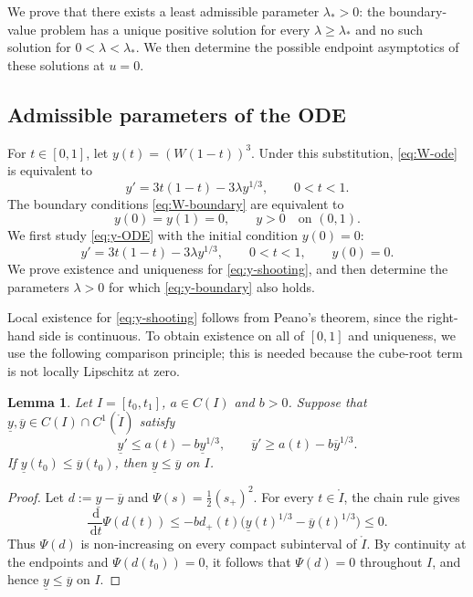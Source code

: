 \documentclass[a4paper,fleqn]{cas-sc}
\numberwithin{equation}{section}
\theoremstyle{plain}
\newtheorem{lemma}[theorem]{Lemma}
\theoremstyle{definition}
\newcommand{\dd}{\,\mathrm d}
\begin{document}
We prove that there exists a least admissible parameter $\lambda_*>0$: the
boundary-value problem has a unique positive solution for every
$\lambda\ge\lambda_*$ and no such solution for $0<\lambda<\lambda_*$.  We
then determine the possible endpoint asymptotics of these solutions at
$u=0$.

\subsection{Admissible parameters of the ODE}

For $t\in[0,1]$, let $y(t)=(W(1-t))^3$.  Under this substitution,
\eqref{eq:W-ode} is equivalent to
\begin{equation}
 y'=3t(1-t)-3\lambda y^{1/3}, \qquad 0<t<1.
 \label{eq:y-ODE}
\end{equation}
The boundary conditions \eqref{eq:W-boundary} are equivalent to
\begin{equation}
    \label{eq:y-boundary}
 y(0)=y(1)=0, \qquad y>0 \quad\text{on }(0,1).
\end{equation}
We first study \eqref{eq:y-ODE} with the initial condition $y(0)=0$:
\begin{equation}
 y'=3t(1-t)-3\lambda y^{1/3}, \qquad 0<t<1,\qquad y(0)=0.
 \label{eq:y-shooting}
\end{equation}
We prove existence and uniqueness for \eqref{eq:y-shooting}, and then
determine the parameters $\lambda>0$ for which \eqref{eq:y-boundary} also
holds.

Local existence for \eqref{eq:y-shooting} follows from Peano's theorem, since
the right-hand side is continuous.  To obtain existence on all of \([0,1]\) and
uniqueness, we use the following comparison principle; this is needed because
the cube-root term is not locally Lipschitz at zero.

\begin{lemma}
\label{lem:cuberoot-comparison}
Let \(I=[t_0,t_1]\), \(a\in C(I)\) and \(b>0\). Suppose that
\(\underline y,\overline y\in C(I)\cap C^1(\mathring{I})\) satisfy
\[
 \underline y'\le a(t)-b\underline y^{1/3},
 \qquad
 \overline y'\ge a(t)-b\overline y^{1/3}.
\]
If
\(\underline y(t_0)\le\overline y(t_0)\), then
\(\underline y\le\overline y\) on \(I\).
\end{lemma}

\begin{proof}
Let \(d:=\underline y-\overline y\) and
\(\Psi(s)=\frac12(s_+)^2\).  For every \(t\in\mathring I\), the chain
rule gives
\[
 \frac{\dd}{\dd t}\Psi(d(t))
 \le -b d_+(t)
 \bigl(\underline y(t)^{1/3}-\overline y(t)^{1/3}\bigr)
 \le 0.
\]
Thus \(\Psi(d)\) is non-increasing on every compact subinterval of
$\mathring I$.  By continuity at the endpoints and
\(\Psi(d(t_0))=0\), it follows that \(\Psi(d)=0\) throughout \(I\), and hence
\(\underline y\le\overline y\) on \(I\).
\end{proof}
\end{document}
